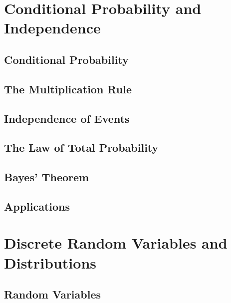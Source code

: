 \documentclass[
  12pt,
]{krantzNoCorner}
\begin{document}
\hypertarget{conditional-probability-and-independence}{%
\chapter{Conditional Probability and Independence}\label{conditional-probability-and-independence}}

\hypertarget{conditional-probability}{%
\section{Conditional Probability}\label{conditional-probability}}

\hypertarget{the-multiplication-rule}{%
\section{The Multiplication Rule}\label{the-multiplication-rule}}

\hypertarget{independence-of-events}{%
\section{Independence of Events}\label{independence-of-events}}

\hypertarget{the-law-of-total-probability}{%
\section{The Law of Total Probability}\label{the-law-of-total-probability}}

\hypertarget{bayes-theorem}{%
\section{Bayes' Theorem}\label{bayes-theorem}}

\hypertarget{applications}{%
\section{Applications}\label{applications}}

\hypertarget{discrete-random-variables-and-distributions}{%
\chapter{Discrete Random Variables and Distributions}\label{discrete-random-variables-and-distributions}}

\hypertarget{random-variables}{%
\section{Random Variables}\label{random-variables}}
\end{document}
